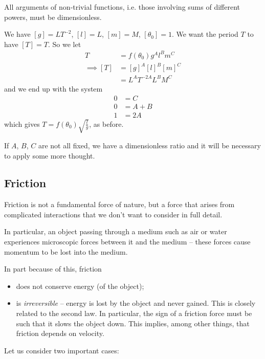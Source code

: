 \documentclass{../../template/note}
\begin{document}
    \begin{corollary}
        All arguments of non-trivial functions, i.e. those involving sums of different powers, must be dimensionless.
    \end{corollary}
    
    \begin{example*}
        We have \([g] = \si{LT^{-2}}\), \([l] = \si{L}\), \([m] = \si{M}\), \([\theta_0] = 1\). We want the period \(T\) to have \([T] = \si{T}\). So we let
        \begin{align*}
            T &= f(\theta_0) g^A l^B m^C \\
            \implies [T] &= [g]^A [l]^B [m]^C \\
            &= \si{L^A T^{-2A} L^B M^C}
        \end{align*}
        and we end up with the system
        \begin{align*}
            0 &= C \\
            0 &= A + B \\
            1 &= 2A
        \end{align*}
        which gives \(T = f(\theta_0) \sqrt{\frac l g}\), as before.
    \end{example*}
    
    If \(A\), \(B\), \(C\) are not all fixed, we have a dimensionless ratio and it will be necessary to apply some more thought.


    \subsection{Friction}

    Friction is not a fundamental force of nature, but a force that arises from complicated interactions that we don't want to consider in full detail.

    In particular, an object passing through a medium such as air or water experiences microscopic forces between it and the medium -- these forces cause momentum to be lost into the medium.

    In part because of this, friction
    \begin{itemize}
        \item does not conserve energy (of the object);
        \item is \emph{irreversible} -- energy is lost by the object and never gained. This is closely related to the second law. In particular, the sign of a friction force must be such that it slows the object down. This implies, among other things, that friction depends on velocity.
    \end{itemize}
    Let us consider two important cases:
\end{document}
